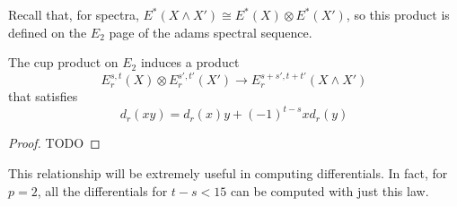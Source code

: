 Recall that, for spectra, $E^*(X\wedge X')\cong E^*(X)\otimes E^*(X')$, so this product is defined on the $E_2$ page of the adams spectral sequence.  
\begin{Theorem}
The cup product on $E_2$ induces a product
\[E_r^{s,t}(X)\otimes E_r^{s',t'}(X')\to E_r^{s+s',t+t'}(X\wedge X')\]
that satisfies
\[d_r(xy)=d_r(x)y+(-1)^{t-s}xd_r(y)\]
\end{Theorem}

\begin{proof}
TODO
\end{proof}


This relationship will be extremely useful in computing differentials.  In fact, for $p=2$, all the differentials for $t-s<15$ can be computed with just this law.  


